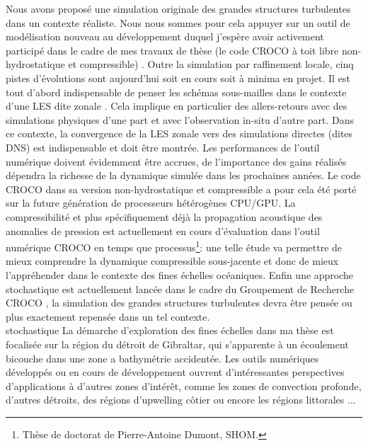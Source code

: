 Nous avons proposé une simulation originale des grandes structures turbulentes dans un contexte réaliste. Nous nous sommes pour cela appuyer sur un outil de modélisation nouveau au développement duquel j'espère avoir activement participé dans le cadre de mes travaux de thèse (le code CROCO à toit libre non-hydrostatique et compressible) \citep{hilt_2020}. Outre la simulation par raffinement locale, cinq pistes d'évolutions sont aujourd'hui soit en cours soit à minima en projet. Il est tout d'abord indispensable de penser les schémas sous-mailles dans le contexte d'une LES dite zonale \cite{friess_modelisation_2010}. Cela implique en particulier des allers-retours avec des simulations physiques d'une part et avec l'observation in-situ d'autre part. Dans ce contexte, la convergence de la LES zonale vers des simulations directes (dites DNS) est indispensable et doit être montrée. Les performances de l'outil numérique doivent évidemment être accrues, de l'importance des gains réalisés dépendra la richesse de la dynamique simulée dans les prochaines années. Le code CROCO dans sa version non-hydrostatique et compressible a pour cela été porté sur la future génération de processeurs hétérogènes CPU/GPU. La compressibilité et plus spécifiquement déjà la propagation acoustique des anomalies de pression est actuellement en cours d'évaluation dans l'outil numérique CROCO en temps que processus\footnote{Thèse de doctorat de Pierre-Antoine Dumont, SHOM.}: une telle étude va permettre de mieux comprendre la dynamique compressible sous-jacente et donc de mieux l'appréhender dans le contexte des fines échelles océaniques. Enfin une approche stochastique est actuellement lancée dans le cadre du Groupement de Recherche CROCO \citep{memin_fluid_2014}, la simulation des grandes structures turbulentes devra être pensée ou plus exactement repensée dans un tel contexte.\\
stochastique
\color{black}
La démarche d'exploration des fines échelles dans ma thèse est focalisée sur la région du détroit de Gibraltar, qui s'apparente à un écoulement bicouche dans une zone a bathymétrie accidentée. Les outils numériques développés ou en cours de développement ouvrent d'intéressantes perspectives d'applications à d'autres zones d'intérêt, comme les zones de convection profonde, d'autres détroits, des régions d'upwelling côtier ou encore les régions littorales \citep{marchesiello_tridimensional_2021}...




